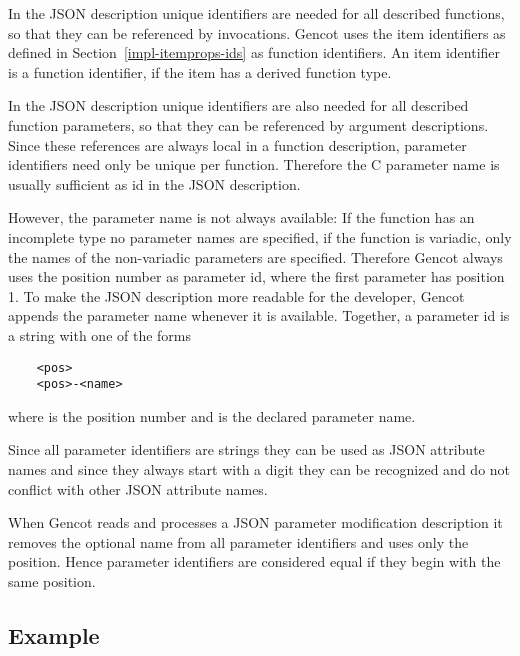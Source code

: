 In the JSON description unique identifiers are needed for all described functions, so that they can be referenced by
invocations. Gencot uses the item identifiers as defined in Section~\ref{impl-itemprops-ids} as function identifiers.
An item identifier is a function identifier, if the item has a derived function type.

In the JSON description unique identifiers are also needed for all described function parameters, so that they can 
be referenced by argument descriptions. Since these references are always local in a function description, parameter
identifiers need only be unique per function. Therefore the C parameter name is usually sufficient as id in the 
JSON description.

However, the parameter name is not always available: If the function has an incomplete type no parameter names are
specified, if the function is variadic, only the names of the non-variadic parameters are specified. Therefore
Gencot always uses the position number as parameter id, where the first parameter has position 1. To make the JSON
description more readable for the developer, Gencot appends the parameter name whenever it is available. Together,
a parameter id is a string with one of the forms
\begin{verbatim}
    <pos>
    <pos>-<name>
\end{verbatim}
where  is the position number and  is the declared parameter name.

Since all parameter identifiers are strings they can be used as JSON attribute names and since they always
start with a digit they can be recognized and do not conflict with other JSON attribute names. 

When Gencot reads and processes a JSON parameter modification description it removes the optional name from 
all parameter identifiers and uses only the position. Hence parameter identifiers are considered equal if they
begin with the same position.

\subsection{Example}

